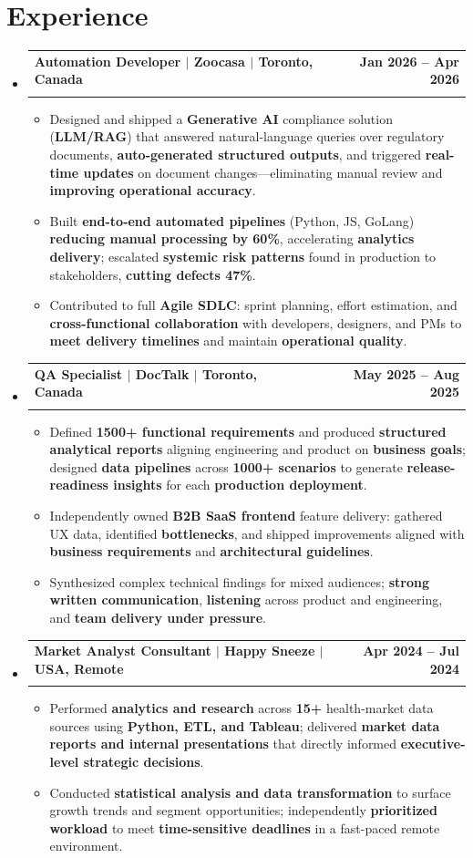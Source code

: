 \documentclass[letterpaper,10pt]{article}
\makeatletter
\newcommand{\resumeItem}[1]{
  \item\small{
    {#1 \vspace{-1pt}}
  }
}
\newcommand{\resumeSubheading}[4]{
  \vspace{-1pt}\item
    \begin{tabular*}{1.0\textwidth}[t]{l@{\extracolsep{\fill}}r}
      \textbf{#1} & \textbf{\small #2} \\
      \textit{\small#3} & \textit{\small #4} \\[-2pt]
    \end{tabular*}\vspace{-7pt}
}
\newcommand{\resumeSubHeadingListStart}{\begin{itemize}[leftmargin=0.0in, label={}]}
\newcommand{\resumeSubHeadingListEnd}{\end{itemize}}
\newcommand{\resumeItemListStart}{\begin{itemize}[leftmargin=0.15in, topsep=0pt, itemsep=0pt, parsep=0pt, partopsep=0pt]}
\newcommand{\resumeItemListEnd}{\end{itemize}\vspace{-3pt}}
\makeatother
\begin{document}
\section{Experience}
  \resumeSubHeadingListStart
    \resumeSubheading
      {Automation Developer $|$ Zoocasa $|$ Toronto, Canada}{Jan 2026 -- Apr 2026}
      {}{}
      \vspace{-9pt}
      \resumeItemListStart
        \resumeItem{Designed and shipped a \textbf{Generative AI} compliance solution (\textbf{LLM/RAG}) that answered natural-language queries over regulatory documents, \textbf{auto-generated structured outputs}, and triggered \textbf{real-time updates} on document changes---eliminating manual review and \textbf{improving operational accuracy}.}
        \resumeItem{Built \textbf{end-to-end automated pipelines} (Python, JS, GoLang) \textbf{reducing manual processing by 60\%}, accelerating \textbf{analytics delivery}; escalated \textbf{systemic risk patterns} found in production to stakeholders, \textbf{cutting defects 47\%}.}
        \resumeItem{Contributed to full \textbf{Agile SDLC}: sprint planning, effort estimation, and \textbf{cross-functional collaboration} with developers, designers, and PMs to \textbf{meet delivery timelines} and maintain \textbf{operational quality}.}
      \resumeItemListEnd
    \resumeSubheading
      {QA Specialist $|$ DocTalk $|$ Toronto, Canada}{May 2025 -- Aug 2025}
      {}{}
      \vspace{-9pt}
      \resumeItemListStart
        \resumeItem{Defined \textbf{1500+ functional requirements} and produced \textbf{structured analytical reports} aligning engineering and product on \textbf{business goals}; designed \textbf{data pipelines} across \textbf{1000+ scenarios} to generate \textbf{release-readiness insights} for each \textbf{production deployment}.}
        \resumeItem{Independently owned \textbf{B2B SaaS frontend} feature delivery: gathered UX data, identified \textbf{bottlenecks}, and shipped improvements aligned with \textbf{business requirements} and \textbf{architectural guidelines}.}
        \resumeItem{Synthesized complex technical findings for mixed audiences; \textbf{strong written communication}, \textbf{listening} across product and engineering, and \textbf{team delivery under pressure}.}
      \resumeItemListEnd
    \resumeSubheading
      {Market Analyst Consultant $|$ Happy Sneeze $|$ USA, Remote}{Apr 2024 -- Jul 2024}
      {}{}
      \vspace{-9pt}
      \resumeItemListStart
        \resumeItem{Performed \textbf{analytics and research} across \textbf{15+} health-market data sources using \textbf{Python, ETL, and Tableau}; delivered \textbf{market data reports and internal presentations} that directly informed \textbf{executive-level strategic decisions}.}
        \resumeItem{Conducted \textbf{statistical analysis and data transformation} to surface growth trends and segment opportunities; independently \textbf{prioritized workload} to meet \textbf{time-sensitive deadlines} in a fast-paced remote environment.}
      \resumeItemListEnd
  \resumeSubHeadingListEnd
\vspace{-6pt}
\end{document}
